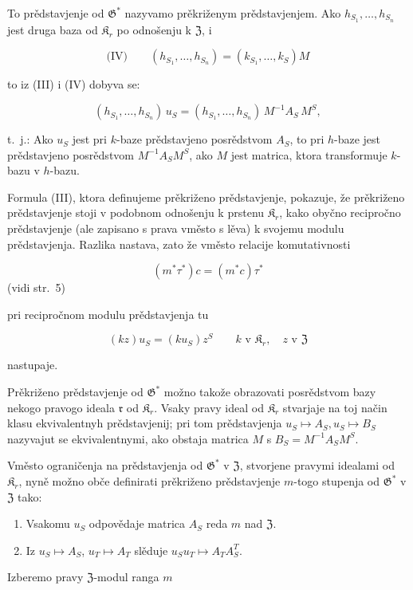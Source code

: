 \documentclass[11pt]{article}
\begin{document}
To prědstavjenje od \(\mathfrak{G}^*\) nazyvamo prěkriženym prědstavjenjem. Ako \(h_{S_1}, \ldots, h_{S_n}\) jest druga baza od \(\mathfrak{K}_r\) po odnošenju k \(\mathfrak{Z}\), i

\[
\text{(IV)}\qquad (h_{S_1}, \ldots, h_{S_n}) = (k_{S_1}, \ldots, k_S)M
\]

to iz (III) i (IV) dobyva se:

\[(h_{S_1},\ldots,h_{S_n})\,u_S=(h_{S_1},\ldots,h_{S_n})\,M^{-1}A_S\,M^S,\]

t.~j.: Ako \(u_S\) jest pri \(k\)-baze prědstavjeno posrědstvom \(A_S\), to pri \(h\)-baze jest prědstavjeno posrědstvom \(M^{-1}A_SM^S\), ako \(M\) jest matrica, ktora transformuje \(k\)-bazu v \(h\)-bazu.

Formula (III), ktora definujeme prěkriženo prědstavjenje, pokazuje, že prěkriženo prědstavjenje stoji v podobnom odnošenju k prstenu \(\mathfrak K_r\), kako obyčno recipročno prědstavjenje (ale zapisano s prava vměsto s lěva) k svojemu modulu prědstavjenja. Razlika nastava, zato že vměsto relacije komutativnosti

\[(m^*\tau^*)c = (m^*c)\tau^*\]
(vidi str.~5)

pri recipročnom modulu prědstavjenja tu

\[
(kz)u_S=(ku_S)z^S\qquad k\text{ v }\mathfrak K_r,\quad z\text{ v }\mathfrak Z
\]

nastupaje.

Prěkriženo prědstavjenje od \(\mathfrak{G}^*\) možno takože obrazovati posrědstvom bazy nekogo pravogo ideala \(\mathfrak r\) od \(\mathfrak{K}_r\). Vsaky pravy ideal od \(\mathfrak{K}_r\) stvarjaje na toj način klasu ekvivalentnyh prědstavjenij; pri tom prědstavjenja \(u_S \mapsto A_S, u_S \mapsto B_S\) nazyvajut se ekvivalentnymi, ako obstaja matrica \(M\) s \(B_S = M^{-1}A_SM^S\).

Vměsto ograničenja na prědstavjenja od \(\mathfrak G^*\) v \(\mathfrak Z\), stvorjene pravymi idealami od \(\mathfrak K_r\), nyně možno obče definirati prěkriženo prědstavjenje \(m\)-togo stupenja od \(\mathfrak G^*\) v \(\mathfrak Z\) tako:

\begin{enumerate}
\item Vsakomu \(u_S\) odpovědaje matrica \(A_S\) reda \(m\) nad \(\mathfrak Z\).
\item Iz \(u_S \mapsto A_S\), \(u_T \mapsto A_T\) slěduje \(u_Su_T \mapsto A_TA_S^T\).
\end{enumerate}

Izberemo pravy \(\mathfrak Z\)-modul ranga \(m\)
\end{document}
